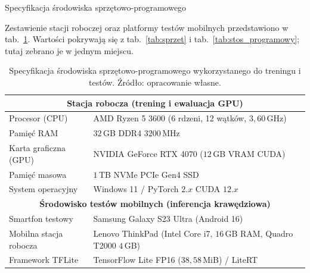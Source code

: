 \begin{easyappendix}{Specyfikacja środowiska sprzętowo-programowego}

Zestawienie stacji roboczej oraz platformy testów mobilnych przedstawiono w tab.~\ref{tab:zal1_srodowisko}. Wartości pokrywają się z tab.~\ref{tab:sprzet} i tab.~\ref{tab:stos_programowy}; tutaj zebrano je w jednym miejscu.

\begin{table}[H]
\centering
\caption{Specyfikacja środowiska sprzętowo-programowego wykorzystanego do treningu i testów. Źródło: opracowanie własne.}
\label{tab:zal1_srodowisko}
\begin{tabular}{ |p{4.5cm}||p{8.5cm}| }
 \hline
 \multicolumn{2}{|c|}{\textbf{Stacja robocza (trening i ewaluacja GPU)}} \\
 \hline
 Procesor (CPU) & AMD Ryzen 5 3600 (6 rdzeni, 12 wątków, $3{,}60$\,GHz) \\
 Pamięć RAM & $32$\,GB DDR4 $3200$\,MHz \\
 Karta graficzna (GPU) & NVIDIA GeForce RTX 4070 ($12$\,GB VRAM CUDA) \\
 Pamięć masowa & $1$\,TB NVMe PCIe Gen4 SSD \\
 System operacyjny & Windows 11 / PyTorch $2.x$ CUDA $12.x$ \\
 \hline
 \multicolumn{2}{|c|}{\textbf{Środowisko testów mobilnych (inferencja krawędziowa)}} \\
 \hline
 Smartfon testowy & Samsung Galaxy S23 Ultra (Android 16) \\
 Mobilna stacja robocza & Lenovo ThinkPad (Intel Core i7, $16$\,GB RAM, Quadro T2000 $4$\,GB) \\
 Framework TFLite & TensorFlow Lite FP16 ($38{,}58$\,MiB) / LiteRT \\
 \hline
\end{tabular}
\end{table}

\end{easyappendix}

